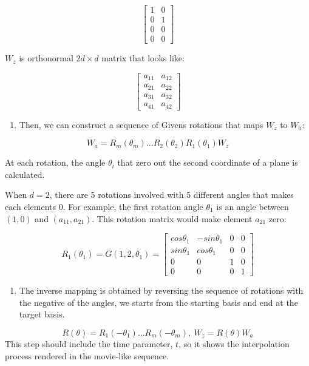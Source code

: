 \[ \begin{bmatrix}1 & 0 \\0  &1 \\ 0&0 \\0&0\end{bmatrix} \]

\(W_z\) is orthonormal \(2d\times d\) matrix that looks like:

\[ \begin{bmatrix} a_{11} & a_{12} \\a_{21}  &a_{22} \\ a_{31}&a_{32} \\a_{41}&a_{42}\end{bmatrix} \]

\begin{enumerate}
\def\labelenumi{\arabic{enumi}.}
\setcounter{enumi}{2}
\tightlist
\item
  Then, we can construct a sequence of Givens rotations that maps \(W_z\) to \(W_a\):
\end{enumerate}

\[ W_a = R_m(\theta_m) ... R_2(\theta_2)R_1(\theta_1)W_z\]

At each rotation, the angle \(\theta_i\) that zero out the second coordinate of a plane is calculated.

When \(d = 2\), there are 5 rotations involved with 5 different angles that makes each elements 0. For example, the first rotation angle \(\theta_1\) is an angle between \((1, 0)\) and \((a_{11}, a_{21})\). This rotation matrix would make element \(a_{21}\) zero:

\[R_1(\theta_1) = G(1, 2, \theta_1) = \begin{bmatrix} cos\theta_1 & -sin\theta_1 & 0 & 0 \\sin\theta_1  &cos\theta_1 & 0 &0 \\ 0&0&1&0 \\0&0&0&1\end{bmatrix}\]

\begin{enumerate}
\def\labelenumi{\arabic{enumi}.}
\setcounter{enumi}{3}
\tightlist
\item
  The inverse mapping is obtained by reversing the sequence of rotations with the negative of the angles, we starts from the starting basis and end at the target basis.
\end{enumerate}

\[R(\theta) = R_1(-\theta_1) ... R_m(-\theta_m), \    W_z = R(\theta)W_a\]
This step should include the time parameter, \(t\), so it shows the interpolation process rendered in the movie-like sequence.

